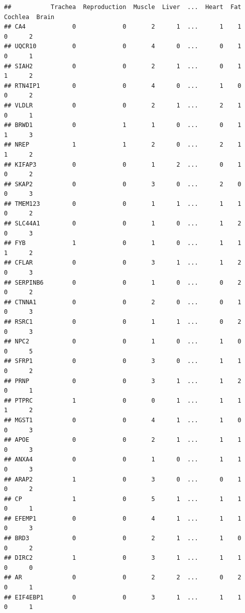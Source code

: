 \documentclass[
]{article}
\begin{document}
\begin{verbatim}
##           Trachea  Reproduction  Muscle  Liver  ...  Heart  Fat  Cochlea  Brain
## CA4             0             0       2      1  ...      1    1        0      2
## UQCR10          0             0       4      0  ...      0    1        0      1
## SIAH2           0             0       2      1  ...      0    1        1      2
## RTN4IP1         0             0       4      0  ...      1    0        0      2
## VLDLR           0             0       2      1  ...      2    1        0      1
## BRWD1           0             1       1      0  ...      0    1        1      3
## NREP            1             1       2      0  ...      2    1        1      2
## KIFAP3          0             0       1      2  ...      0    1        0      2
## SKAP2           0             0       3      0  ...      2    0        0      3
## TMEM123         0             0       1      1  ...      1    1        0      2
## SLC44A1         0             0       1      0  ...      1    2        0      3
## FYB             1             0       1      0  ...      1    1        1      2
## CFLAR           0             0       3      1  ...      1    2        0      3
## SERPINB6        0             0       1      0  ...      0    2        0      2
## CTNNA1          0             0       2      0  ...      0    1        0      3
## RSRC1           0             0       1      1  ...      0    2        0      3
## NPC2            0             0       1      0  ...      1    0        0      5
## SFRP1           0             0       3      0  ...      1    1        0      2
## PRNP            0             0       3      1  ...      1    2        0      1
## PTPRC           1             0       0      1  ...      1    1        1      2
## MGST1           0             0       4      1  ...      1    0        0      3
## APOE            0             0       2      1  ...      1    1        0      3
## ANXA4           0             0       1      0  ...      1    1        0      3
## ARAP2           1             0       3      0  ...      0    1        0      2
## CP              1             0       5      1  ...      1    1        0      1
## EFEMP1          0             0       4      1  ...      1    1        0      3
## BRD3            0             0       2      1  ...      1    0        0      2
## DIRC2           1             0       3      1  ...      1    1        0      0
## AR              0             0       2      2  ...      0    2        0      1
## EIF4EBP1        0             0       3      1  ...      1    1        0      1

\end{verbatim}
\end{document}
